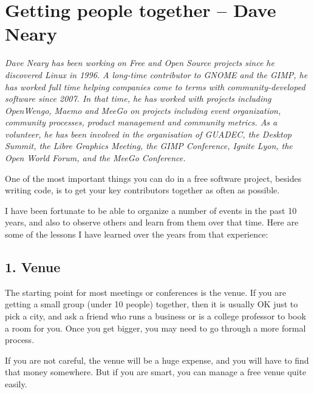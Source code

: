 \chapter{Getting people together -- Dave Neary }

\textit{Dave Neary has been working on Free and Open Source projects since he
discovered Linux in 1996. A long-time contributor to GNOME and the GIMP,
he has worked full time helping companies come to terms with
community-developed software since 2007. In that time, he has worked
with projects including OpenWengo, Maemo and MeeGo on projects including
event organization, community processes, product management and
community metrics. As a volunteer, he has been involved in the
organisation of GUADEC, the Desktop Summit, the Libre Graphics Meeting,
the GIMP Conference, Ignite Lyon, the Open World Forum, and the MeeGo
Conference.
}

One of the most important things you can do in a free software project,
besides writing code, is to get your key contributors together as often
as possible.

I have been fortunate to be able to organize a number of events in the
past 10 years, and also to observe others and learn from them over that
time. Here are some of the lessons I have learned over the years from that
experience:

\section*{1. Venue}

The starting point for most meetings or conferences is the venue. If
you are getting a small group (under 10 people) together, then it is
usually OK just to pick a city, and ask a friend who runs a business or
is a college professor to book a room for you. Once you get bigger, you
may need to go through a more formal process.

If you are not careful, the venue will be a huge expense, and you will have
to find that money somewhere. But if you are smart, you can manage a
free venue quite easily.

